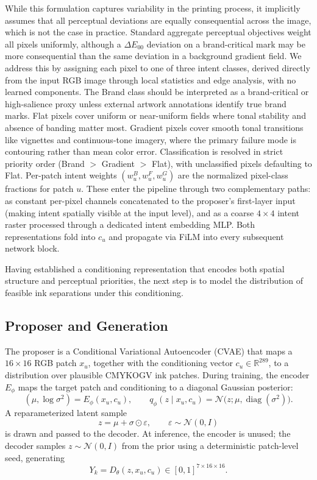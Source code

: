 \documentclass[11pt]{article}
\begin{document}
While this formulation captures variability in the printing process, it implicitly assumes that all perceptual deviations are equally consequential across the image, which is not the case in practice. Standard aggregate perceptual objectives weight all pixels uniformly, although a $\Delta E_{00}$ deviation on a brand-critical mark may be more consequential than the same deviation in a background gradient field. We address this by assigning each pixel to one of three intent classes, derived directly from the input RGB image through local statistics and edge analysis, with no learned components. The Brand class should be interpreted as a brand-critical or high-salience proxy unless external artwork annotations identify true brand marks. Flat pixels cover uniform or near-uniform fields where tonal stability and absence of banding matter most. Gradient pixels cover smooth tonal transitions like vignettes and continuous-tone imagery, where the primary failure mode is contouring rather than mean color error. Classification is resolved in strict priority order (Brand $>$ Gradient $>$ Flat), with unclassified pixels defaulting to Flat. Per-patch intent weights $(w_u^B, w_u^F, w_u^G)$ are the normalized pixel-class fractions for patch $u$. These enter the pipeline through two complementary paths: as constant per-pixel channels concatenated to the proposer's first-layer input (making intent spatially visible at the input level), and as a coarse $4\times 4$ intent raster processed through a dedicated intent embedding MLP. Both representations fold into $c_u$ and propagate via FiLM into every subsequent network block.

Having established a conditioning representation that encodes both spatial structure and perceptual priorities, the next step is to model the distribution of feasible ink separations under this conditioning.

\subsection{Proposer and Generation}

The proposer is a Conditional Variational Autoencoder (CVAE) \cite{kingma,sohn} that maps a $16\times 16$ RGB patch $x_u$, together with the conditioning vector $c_u \in \mathbb{R}^{289}$, to a distribution over plausible CMYKOGV ink patches. During training, the encoder $E_{\phi}$ maps the target patch and conditioning to a diagonal Gaussian posterior:
\[
(\mu, \log \sigma^2) = E_{\phi}(x_u, c_u), \qquad
q_{\phi}(z \mid x_u, c_u) = \mathcal{N}\!\bigl(z; \mu, \operatorname{diag}(\sigma^2)\bigr).
\]
A reparameterized latent sample
\[
z = \mu + \sigma \odot \varepsilon, \qquad \varepsilon \sim \mathcal{N}(0,I)
\]
is drawn and passed to the decoder. At inference, the encoder is unused; the decoder samples $z \sim \mathcal{N}(0,I)$ from the prior using a deterministic patch-level seed, generating
\[
Y_k = D_{\theta}(z, x_u, c_u) \in [0,1]^{7\times 16\times 16}.
\]
\end{document}
